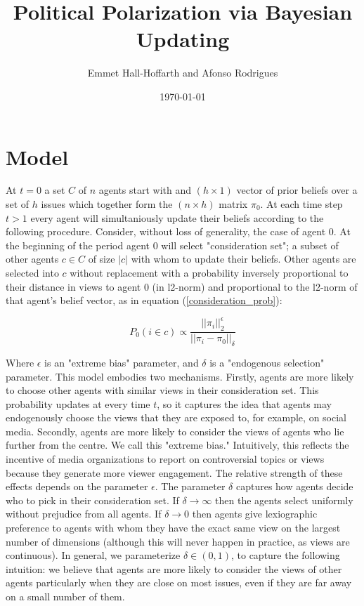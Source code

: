 \documentclass{article}
\title{Political Polarization via Bayesian Updating}
\author{Emmet Hall-Hoffarth and Afonso Rodrigues}
\date{\today}
\begin{document}
\maketitle
    
\section{Model}

At $t=0$ a set $C$ of $n$ agents start with and $(h \times 1)$ vector of prior beliefs over a set of $h$ issues which together form the $(n \times h)$ matrix $\pi_0$. At each time step $t > 1$ every agent will simultaniously update their beliefs according to the following procedure. Consider, without loss of generality, the case of agent 0. At the beginning of the period agent 0 will select "consideration set"; a subset of other agents $c \in C$ of size $|c|$ with whom to update their beliefs. Other agents are selected into $c$ without replacement with a probability inversely proportional to their distance in views to agent 0 (in l2-norm) and proportional to the l2-norm of that agent's belief vector, as in equation (\ref{consideration_prob}):

\begin{equation}
    P_0(i \in c) \propto \frac{{||\pi_i||}_2^\epsilon}{{||\pi_i - \pi_0||}_\delta}
    \label{consideration_prob}
\end{equation}

Where $\epsilon$ is an "extreme bias" parameter, and $\delta$ is a "endogenous selection" parameter. This model embodies two mechanisms. Firstly, agents are more likely to choose other agents with similar views in their consideration set. This probability updates at every time $t$, so it captures the idea that agents may endogenously choose the views that they are exposed to, for example, on social media. Secondly, agents are more likely to consider the views of agents who lie further from the centre. We call this "extreme bias." Intuitively, this reflects the incentive of media organizations to report on controversial topics or views because they generate more viewer engagement. The relative strength of these effects depends on the parameter $\epsilon$. The parameter $\delta$ captures how agents decide who to pick in their consideration set. If $\delta \to \infty$ then the agents select uniformly without prejudice from all agents. If $\delta \to 0$ then agents give lexiographic preference to agents with whom they have the exact same view on the largest number of dimensions (although this will never happen in practice, as views are continuous). In general, we parameterize $\delta \in (0, 1)$, to capture the following intuition: we believe that agents are more likely to consider the views of other agents particularly when they are close on most issues, even if they are far away on a small number of them.  
\end{document}
